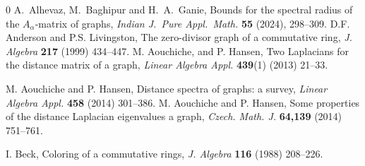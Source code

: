 \documentclass[12pt,twoside]{article}
\begin{document}
	\begin{thebibliography}{0}
		A.~Alhevaz, M.~Baghipur and H.~A.~Ganie,
		Bounds for the spectral radius of the $A_\alpha$-matrix of graphs,
		\emph{Indian J.\ Pure Appl.\ Math.} \textbf{55} (2024), 298--309.
		 { D.F. Anderson and P.S. Livingston, The zero-divisor graph of a commutative ring, \em J. Algebra} {\bf 217} (1999) 434--447.
		 M. Aouchiche, and  P. Hansen, Two Laplacians for the distance matrix of a graph, \emph{Linear Algebra  Appl.} \textbf{439}(1) (2013)  21--33.
		
		 M. Aouchiche and  P. Hansen,  Distance spectra of graphs: a survey,  \textit{Linear Algebra Appl.} {\bf 458} (2014) 301--386.
		 M. Aouchiche and  P. Hansen,  Some properties of the distance Laplacian eigenvalues a graph,  \textit{Czech. Math. J.} {\bf 64,139} (2014) 751--761.
		
		  {I. Beck, Coloring of a commutative rings, \em J. Algebra} {\bf 116} (1988) 208--226.
		
		

\end{thebibliography}
\end{document}

